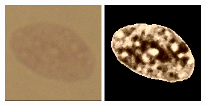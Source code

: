 \begin{figure}[t!]
	\includegraphics[width=0.95\linewidth]{Figures/Chapter2/7c1.png}
	\includegraphics[width=0.95\linewidth]{Figures/Chapter2/7c2.png}
	\endminipage\hfill
	\centering	

\end{figure}
